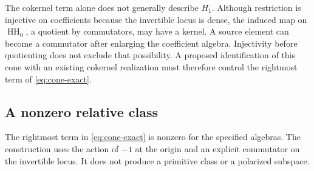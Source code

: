 \documentclass[11pt,letterpaper]{article}
\theoremstyle{definition}
\theoremstyle{remark}
\newcommand{\HH}{\operatorname{HH}}
\begin{document}
The cokernel term alone does not generally describe $H_1$.
Although restriction is injective on coefficients because the
invertible locus is dense, the induced map on $\HH_0$, a quotient
by commutators, may have a kernel. A source element can become a
commutator after enlarging the coefficient algebra. Injectivity
before quotienting does not exclude that possibility. A proposed
identification of this cone with an existing cokernel realization
must therefore control the rightmost term of \eqref{eq:cone-exact}.

\subsection{A nonzero relative class}

The rightmost term in \eqref{eq:cone-exact} is nonzero for the
specified algebras. The construction uses the action of $-1$ at
the origin and an explicit commutator on the invertible locus.
It does not produce a primitive class or a polarized subspace.
\end{document}
